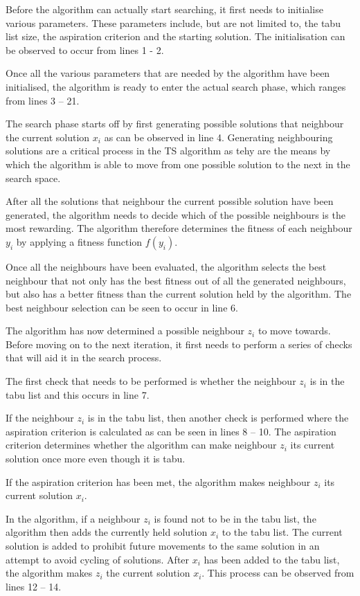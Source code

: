 Before the algorithm can actually start searching, it first needs to initialise various parameters. These parameters include, but are not limited to, the tabu list size, the aspiration criterion and the starting solution. The initialisation can be observed to occur from lines 1 - 2.

Once all the various parameters that are needed by the algorithm have been initialised, the algorithm is ready to enter the actual search phase, which ranges from lines 3 -- 21. 

The search phase starts off by first generating possible solutions that neighbour the current solution $x_i$ as can be observed in line 4. Generating neighbouring solutions are a critical process in the TS algorithm as tehy are the means by which the algorithm is able to move from one possible solution to the next in the search space.

After all the solutions that neighbour the current possible solution have been generated, the algorithm needs to decide which of the possible neighbours is the most rewarding. The algorithm therefore determines the fitness of each neighbour $y_i$ by applying a fitness function $f(y_i)$. 

Once all the neighbours have been evaluated, the algorithm selects the best neighbour that not only has the best fitness out of all the generated neighbours, but also has a better fitness than the current solution held by the algorithm. The best neighbour selection can be seen to occur in line 6.

The algorithm has now determined a possible neighbour $z_i$ to move towards. Before moving on to the next iteration, it first needs to perform a series of checks that will aid it in the search process.

The first check that needs to be performed is whether the neighbour $z_i$ is in the tabu list and this occurs in line 7. 

If the neighbour $z_i$ is in the tabu list, then another check is performed where the aspiration criterion is calculated as can be seen in lines 8 -- 10. The aspiration criterion determines whether the algorithm can make neighbour $z_i$ its current solution once more even though it is tabu. 

If the aspiration criterion has been met, the algorithm makes neighbour $z_i$ its current solution $x_i$. 

In the algorithm, if a neighbour $z_i$ is found not to be in the tabu list, the algorithm then adds the currently held solution $x_i$ to the tabu list. The current solution is added to prohibit future movements to the same solution in an attempt to avoid cycling of solutions. After $x_i$ has been added to the tabu list, the algorithm makes $z_i$ the current solution $x_i$. This process can be observed from lines 12 -- 14.

